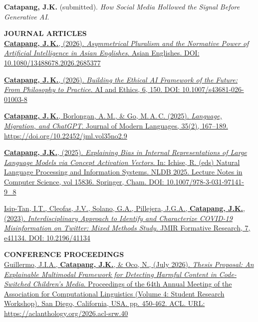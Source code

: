 \documentclass[margin]{res}
\begin{document}
\begin{resume}
\vspace{-12pt}

 \textbf{Catapang, J.K.} (submitted). \textit{How Social Media Hollowed the Signal Before Generative AI}.

\textbf{JOURNAL ARTICLES}\\
 \href{https://doi.org/10.1080/13488678.2026.2685377}{\textbf{Catapang, J.\,K.}, (2026). \textit{Asymmetrical Pluralism and the Normative Power of Artificial Intelligence in Asian Englishes}. Asian Englishes. DOI: 10.1080/13488678.2026.2685377}

\vspace{-12pt}

 \href{https://doi.org/10.1007/s43681-026-01003-8}{\textbf{Catapang, J.\,K.}, (2026). \textit{Building the Ethical AI Framework of the Future: From Philosophy to Practice}. AI and Ethics, 6, 150. DOI: 10.1007/s43681-026-01003-8}

\vspace{-12pt}

 \href{https://ejournal.um.edu.my/index.php/JML/article/view/60338}{\textbf{Catapang, J.\,K.}, Borlongan, A.\,M., \& Go, M.\,A.\,C. (2025). \textit{Language, Migration, and ChatGPT}. Journal of Modern Languages, 35(2), 167--189. https://doi.org/10.22452/jml.vol35no2.9}

\newpage

 \href{https://doi.org/10.1007/978-3-031-97141-9_8}{\textbf{Catapang, J.K.}, (2025). \textit{Explaining Bias in Internal Representations of Large Language Models via Concept Activation Vectors}. In: Ichise, R. (eds) Natural Language Processing and Information Systems. NLDB 2025. Lecture Notes in Computer Science, vol 15836. Springer, Cham. DOI: 10.1007/978-3-031-97141-9\_8}

\vspace{-12pt}

 \href{https://formative.jmir.org/2023/1/e41134}{Isip-Tan, I.T., Cleofas, J.V., Solano, G.A., Pillejera, J.G.A., \textbf{Catapang, J.K.}, (2023). \textit{Interdisciplinary Approach to Identify and Characterize COVID-19 Misinformation on Twitter: Mixed Methods Study}. JMIR Formative Research, 7, e41134. DOI: 10.2196/41134}

\textbf{CONFERENCE PROCEEDINGS}\\
 \href{https://aclanthology.org/2026.acl-srw.40/}{Guillermo, J.I.A., \textbf{Catapang, J.K.}, \& Oco, N., (July 2026). \textit{Thesis Proposal: An Explainable Multimodal Framework for Detecting Harmful Content in Code-Switched Children's Media}. Proceedings of the 64th Annual Meeting of the Association for Computational Linguistics (Volume 4: Student Research Workshop). San Diego, California, USA. pp. 450-462. ACL. URL: https://aclanthology.org/2026.acl-srw.40}


\end{resume}
\end{document}
